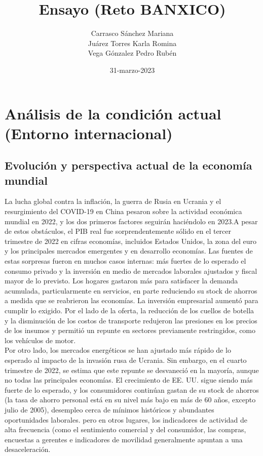 \documentclass{article}
\title{Ensayo (Reto BANXICO) }
\author{Carrasco Sánchez Mariana\\
Juárez Torres Karla Romina\\
Vega Gónzalez Pedro Rubén}
\date{31-marzo-2023}
\theoremstyle{mytheoremstyle}
\theoremstyle{mytheoremstyle}
\theoremstyle{myproblemstyle}
\begin{document}
    \maketitle
  \section{Análisis de la condición actual (Entorno internacional)}

  \subsection{Evolución y perspectiva actual de la economía mundial}

  La lucha global contra la inflación, la guerra de Rusia en Ucrania y el resurgimiento del COVID-19 en China pesaron sobre la actividad económica mundial en 2022, y los dos primeros factores seguirán haciéndolo en 2023.A pesar de estos obstáculos, el PIB real fue sorprendentemente sólido en el tercer trimestre de 2022 en cifras
economías, incluidos Estados Unidos, la zona del euro y los principales mercados emergentes y en desarrollo economías. Las fuentes de estas sorpresas fueron en muchos casos internas: más fuertes de lo esperado el consumo privado y la inversión en medio de mercados laborales ajustados y fiscal mayor de lo previsto. Los hogares gastaron más para satisfacer la demanda acumulada, particularmente en servicios, en parte reduciendo su stock de ahorros a medida que se reabrieron las economías. La inversión empresarial aumentó para cumplir lo exigido. Por el lado de la oferta, la reducción de los cuellos de botella y la disminución de los costos de transporte redujeron las presiones en los precios de los insumos y permitió un repunte en sectores previamente restringidos, como los vehículos de motor.\\

Por otro lado, los mercados energéticos se han ajustado más rápido de lo esperado al impacto de la invasión rusa de Ucrania. Sin embargo, en el cuarto trimestre de 2022, se estima que este repunte se desvaneció en la mayoría, aunque no todas las principales economías. El crecimiento de EE. UU. sigue siendo más fuerte de lo esperado, y los consumidores continúan gastan de su stock de ahorros (la tasa de ahorro personal está en su nivel más bajo en más de 60 años, excepto julio de 2005), desempleo cerca de mínimos históricos y abundantes oportunidades laborales. pero en otros lugares, los indicadores de actividad de alta frecuencia (como el sentimiento comercial y del consumidor, las compras, encuestas a gerentes e indicadores de movilidad generalmente apuntan a una desaceleración.\\
\end{document}
